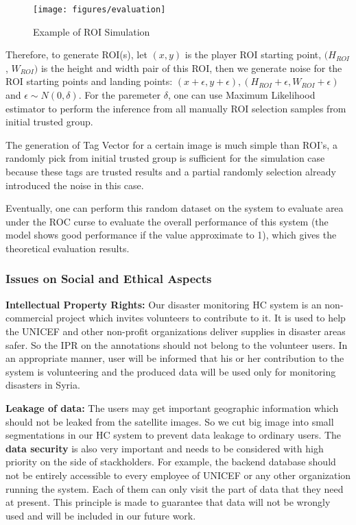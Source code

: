 \begin{figure}[htp]
\centering
\texttt{[image: figures/evaluation]}
\caption{Example of ROI Simulation}
\label{fig:evaluation}
\end{figure}

Therefore, to generate ROI(s), let $(x, y)$ is the player ROI starting point, $(H_{ROI}$, $W_{ROI})$ is the height
and width pair of this ROI, then we generate noise for the ROI starting points and landing points: 
$(x+\epsilon, y+\epsilon), (H_{ROI}+\epsilon, W_{ROI}+\epsilon)$ and $\epsilon \sim N(0, \delta)$.
For the paremeter $\delta$, one can use Maximum Likelihood estimator \cite{johansen1990maximum} 
to perform the inference from all manually ROI selection samples from initial trusted group.

The generation of Tag Vector for a certain image is much simple than ROI's, 
a randomly pick from initial trusted group is sufficient for the simulation case 
because these tags are trusted results and a partial randomly selection already introduced the noise in this case.

Eventually, one can perform this random dataset on the system to evaluate area under the ROC curse to
evaluate the overall performance of this system (the model shows good performance if the value approximate to 1), 
which gives the theoretical evaluation results.

\subsubsection{Issues on Social and Ethical Aspects}
\label{chapter:ethical}

\textbf{Intellectual Property Rights:} 
Our disaster monitoring HC system is an non-commercial project which invites volunteers to contribute to it. 
It is used to help the UNICEF and other non-profit organizations deliver supplies in disaster areas safer. 
So the IPR on the annotations should not belong to the volunteer users. In an appropriate manner, user will be informed that 
his or her contribution to the system is volunteering and the produced data will be used only for 
monitoring disasters in Syria.

\textbf{Leakage of data:} 
The users may get important geographic information which should not be leaked from the satellite images. So we cut big image into small segmentations in our HC system to prevent data leakage to ordinary users. 
The \textbf{data security} is also very important and needs to be considered with high priority on the side of stackholders. For example, 
the backend database should not be entirely accessible to every employee of UNICEF or any other organization running the system.
Each of them can only visit the part of data that they need at present. This principle is made to guarantee 
that data will not be wrongly used and will be included in our future work.

